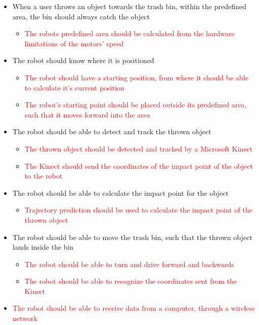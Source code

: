 \begin{itemize}
\item When a user throws an object towards the trash bin, within the predefined area, the bin should always catch the object
\begin{itemize}
\item \textcolor{red}{The robots predefined area should be calculated from the hardware limitations of the motors’ speed}
\end{itemize}
\item The robot should know where it is positioned
\begin{itemize}
\item \textcolor{red}{The robot should have a starting position, from where it should be able to calculate it's current position }
\item \textcolor{red}{The robot's starting point should be placed outside its predefined area, such that it moves forward into the area}
\end{itemize}
\item The robot should be able to detect and track the thrown object
\begin{itemize}
\item \textcolor{red}{The thrown object should be detected and tracked by a Microsoft Kinect}
\item \textcolor{red}{The Kinect should send the coordinates of the impact point of the object to the robot}
\end{itemize}
\item The robot should be able to calculate the impact point for the object
\begin{itemize}
\item \textcolor{red}{Trajectory prediction should be used to calculate the impact point of the thrown object}
\end{itemize}
\item The robot should be able to move the trash bin, such that the thrown object lands inside the bin
\begin{itemize}
\item \textcolor{red}{The robot should be able to turn and drive forward and backwards}
\item \textcolor{red}{The robot should be able to recognize the coordinates sent from the Kinect}
\end{itemize}
\item \textcolor{red}{The robot should be able to receive data from a computer, through a wireless network}
\end{itemize}